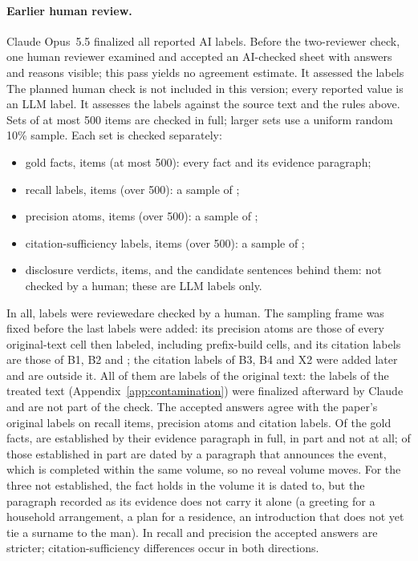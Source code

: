 \paragraph{Earlier human review.} Claude Opus~5.5 finalized all reported AI labels.
\ifnwhuman Before the two-reviewer check, one human reviewer examined and accepted an
AI-checked sheet with answers and reasons visible; this pass yields no agreement estimate.
It assessed the labels \else The planned human check is not included
in this version; every reported value is an LLM label. It assesses the labels \fi against
the source text and the rules above. Sets of at most 500 items are checked in full; larger
sets use a uniform random 10\% sample. Each set is checked separately:
\begin{itemize}[nosep,leftmargin=*]
\item gold facts,  items (at most 500): every fact and its evidence paragraph;
\item recall labels,  items (over 500): a sample of ;
\item precision atoms,  items (over 500): a sample of ;
\item citation-sufficiency labels,  items (over 500): a sample of ;
\item disclosure verdicts,  items, and the  candidate
  sentences behind them: not checked by a human; these are LLM labels only.
\end{itemize}
In all,  labels \ifnwhuman were reviewed\else are checked by a human\fi.
The sampling frame was fixed before the last labels were added: its precision atoms are
those of every original-text cell then labeled, including prefix-build cells, and its
citation labels are those of B1, B2 and \sys; the citation labels of B3, B4 and X2 were
added later and are outside it.
\ifnwdecon All of them are labels of the original text: the labels of the treated text
(Appendix~\ref{app:contamination}) were finalized afterward by Claude and
are not part of the check.
\fi
\ifnwhuman The accepted answers agree with the paper's original labels on
 recall items,  precision atoms and
 citation labels. Of the gold facts,  are established by
their evidence paragraph in full, in part and not at all;  of those
established in part are dated by a paragraph that announces the event, which is completed
within the same volume, so no reveal volume moves. For the three not established, the fact
holds in the volume it is dated to, but the paragraph recorded as its evidence does not carry
it alone (a greeting for a household arrangement, a plan for a residence, an introduction
that does not yet tie a surname to the man). In recall and precision the accepted
answers are stricter; citation-sufficiency differences occur in both directions.

